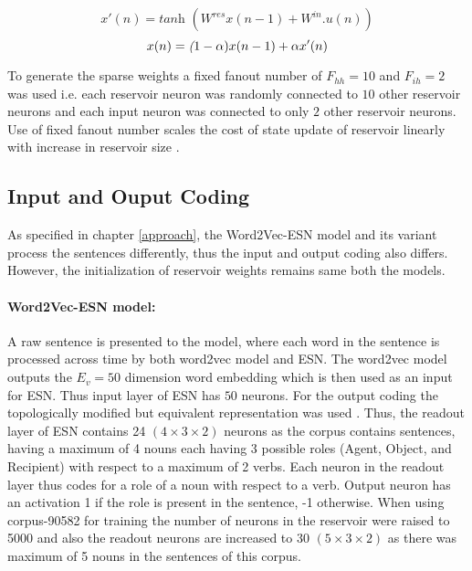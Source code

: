 \begin{equation} \label{eqn:res_new_update}
x'(n) =\textit {tanh } ( W^{res}x(n-1) + W^{in}.u(n))
\end{equation}
\begin{equation} \label{eqn:res_new_state}
x(n) =\textit (1-\alpha) x(n-1) + \alpha x'(n)
\end{equation}

To generate the sparse weights a fixed fanout number of $F_{hh} = 10$ and $F_{ih} = 2$ was used i.e. each reservoir neuron was randomly connected to $10$ other reservoir neurons and each input neuron was connected to only $2$ other reservoir neurons. Use of fixed fanout number scales the cost of state update of reservoir linearly with increase in reservoir size \cite{esn:practical_guide}.

\subsection{Input and Ouput Coding}

As specified in chapter \ref{approach}, the Word2Vec-ESN model and its variant process the sentences differently, thus the input and output coding also differs. However, the initialization of reservoir weights remains same both the models. 

\paragraph{Word2Vec-ESN model:} A raw sentence is presented to the model, where each word in the sentence is processed across time by both word2vec model and ESN. The word2vec model outputs the $E_{v} = 50$ dimension word embedding which is then used as an input for ESN. Thus input layer of ESN has $50$ neurons. For the output coding the topologically modified but equivalent representation was used \cite{xavier:2013:RT}. Thus, the readout layer of ESN contains 24 $(4 \times 3 \times 2)$ neurons as the corpus contains sentences, having a maximum of 4 nouns each having 3 possible roles (Agent, Object, and Recipient) with respect to a maximum of 2 verbs. Each neuron in the readout layer thus codes for a role of a noun with respect to a verb. Output neuron has an activation 1 if the role is present in the sentence, -1 otherwise. When using corpus-90582 for training the number of neurons in the reservoir were raised to 5000 and also the  readout neurons are increased to 30 $(5 \times 3 \times 2)$ as there was maximum of 5 nouns in the sentences of this corpus.

